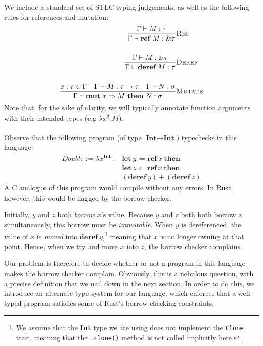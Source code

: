 \documentclass{article}
\newcommand{\mkref}{\textbf{ref}~}
\newcommand{\deref}{\textbf{deref}~}%
\newcommand{\mutate}[3]{\textbf{mut}~ #1 \Rightarrow #2 ~\textbf{then}~ #3}
\newcommand{\letvar}[3]{\textbf{let}~ #1 \Leftarrow #2 ~\textbf{then}~ #3}
\begin{document}
We include a standard set of STLC typing judgements, as well as the following rules for references and mutation:
\begin{align*}
    \frac{\Gamma \vdash M : \tau}{\Gamma \vdash \mkref M : \& \tau}&\textsc{Ref}\\
    ~\\
    \frac{\Gamma \vdash M : \& \tau}{\Gamma \vdash \deref M : \tau}&\textsc{Deref}\\
    ~\\
    \frac{x : \tau \in \Gamma \hspace{1em} \Gamma \vdash M : \tau \rightarrow \tau \hspace{1em} \Gamma \vdash N : \sigma }{\Gamma \vdash \mutate{x}{M}{N} : \sigma}&\textsc{Mutate}\\
\end{align*}
Note that, for the sake of clarity, we will typically annotate function arguments with their intended types (e.g $\lambda x^\sigma . M$).
\\~\\
Observe that the following program (of type $\textbf{Int} \rightarrow \textbf{Int}$) typechecks in this language:
\begin{align*}
    Double := \lambda x^{\textbf{Int}} ~.~ &\letvar{y}{\mkref x}{}\\  %
    &\letvar{z}{\mkref x}{}\\
    &(\deref y) + (\deref z)
\end{align*}
A C analogue of this program would compile without any errors. In Rust, however, this would be flagged by the borrow checker. 

Initially, $y$ and $z$ both \textit{borrow} $x$'s value. Because $y$ and $z$ both both borrow $x$ simultaneously, this borrow must be \textit{immutable}. When $y$ is dereferenced, the value of $x$ is \textit{moved} into $\deref y$,\footnote{We assume that the \textbf{Int} type we are using does not implement the \texttt{Clone} trait, meaning that the \texttt{.clone()} method is not called implicitly here.} meaning that $x$ is no longer owning at that point. Hence, when we try and move $x$ into $z$, the borrow checker complains. 

Our problem is therefore to decide whether or not a program in this language makes the borrow checker complain. Obviously, this is a nebulous question, with a precise definition that we nail down in the next section. In order to do this, we introduce an alternate type system for our language, which enforces that a well-typed program satisfies some of Rust's borrow-checking constraints.
\end{document}

